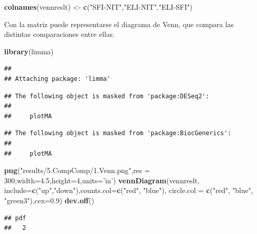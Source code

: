 \documentclass[
]{article}
\newenvironment{Shaded}{\begin{snugshade}}{\end{snugshade}}
\newcommand{\DataTypeTok}[1]{\textcolor[rgb]{0.13,0.29,0.53}{#1}}
\newcommand{\DecValTok}[1]{\textcolor[rgb]{0.00,0.00,0.81}{#1}}
\newcommand{\FloatTok}[1]{\textcolor[rgb]{0.00,0.00,0.81}{#1}}
\newcommand{\KeywordTok}[1]{\textcolor[rgb]{0.13,0.29,0.53}{\textbf{#1}}}
\newcommand{\NormalTok}[1]{#1}
\newcommand{\StringTok}[1]{\textcolor[rgb]{0.31,0.60,0.02}{#1}}
\begin{document}
\begin{Shaded}
\begin{Highlighting}[]
\KeywordTok{colnames}\NormalTok{(vennreslt) <-}\StringTok{ }\KeywordTok{c}\NormalTok{(}\StringTok{"SFI-NIT"}\NormalTok{,}\StringTok{"ELI-NIT"}\NormalTok{,}\StringTok{"ELI-SFI"}\NormalTok{)}
\end{Highlighting}
\end{Shaded}

Con la matriz puede representarse el diagrama de Venn, que compara las
distintas comparaciones entre ellas.

\begin{Shaded}
\begin{Highlighting}[]
\KeywordTok{library}\NormalTok{(limma)}
\end{Highlighting}
\end{Shaded}

\begin{verbatim}
## 
## Attaching package: 'limma'
\end{verbatim}

\begin{verbatim}
## The following object is masked from 'package:DESeq2':
## 
##     plotMA
\end{verbatim}

\begin{verbatim}
## The following object is masked from 'package:BiocGenerics':
## 
##     plotMA
\end{verbatim}

\begin{Shaded}
\begin{Highlighting}[]
\KeywordTok{png}\NormalTok{(}\StringTok{"results/5.CompComp/1.Venn.png"}\NormalTok{,}\DataTypeTok{res =} \DecValTok{300}\NormalTok{,}\DataTypeTok{width=}\FloatTok{4.5}\NormalTok{,}\DataTypeTok{height=}\DecValTok{4}\NormalTok{,}\DataTypeTok{units=}\StringTok{'in'}\NormalTok{)}
\KeywordTok{vennDiagram}\NormalTok{(vennreslt, }\DataTypeTok{include=}\KeywordTok{c}\NormalTok{(}\StringTok{"up"}\NormalTok{,}\StringTok{"down"}\NormalTok{),}\DataTypeTok{counts.col=}\KeywordTok{c}\NormalTok{(}\StringTok{"red"}\NormalTok{, }\StringTok{"blue"}\NormalTok{),}
            \DataTypeTok{circle.col =} \KeywordTok{c}\NormalTok{(}\StringTok{"red"}\NormalTok{, }\StringTok{"blue"}\NormalTok{, }\StringTok{"green3"}\NormalTok{),}\DataTypeTok{cex=}\FloatTok{0.9}\NormalTok{)}
\KeywordTok{dev.off}\NormalTok{()}
\end{Highlighting}
\end{Shaded}

\begin{verbatim}
## pdf 
##   2
\end{verbatim}
\end{document}
